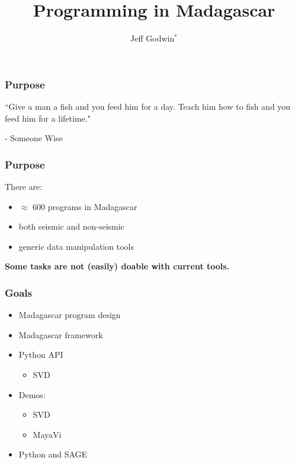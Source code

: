 
\title{Programming in Madagascar}
\author[]{Jeff Godwin$^*$}
\date{}
\large
 {\cwpcover}
\cwpnote{}

\newcommand{\centered}[1]{\begin{center} #1 \end{center}}
\begin{frame} \frametitle{Purpose}

``Give a man a fish and you feed him for a day. Teach him how to fish and you feed him for a lifetime."

 - Someone Wise
\end{frame}

\begin{frame} \frametitle{Purpose}
There are:
\begin{itemize}
\item $\approx$ 600 programs in Madagascar
\item both seismic and non-seismic
\item generic data manipulation tools
\end{itemize}
\end{frame}

\begin{frame}
\textbf{Some tasks are not (easily) doable with current tools.}
\end{frame}

\begin{frame} \frametitle{Goals}
\begin{itemize}
\item Madagascar program design
\item Madagascar framework
\item Python API
\begin{itemize}
\item SVD
\end{itemize}
\item Demos:
\begin{itemize}
\item SVD
\item MayaVi
\end{itemize}
\item Python and SAGE
\end{itemize}
\end{frame}

